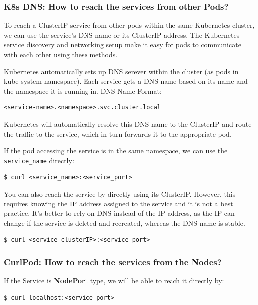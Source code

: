 \documentclass{article}
\newenvironment{blocktemplateII}[1]{%
    \tcolorbox[beamer,%
    noparskip,breakable,
    colframe=Green,%
    colbacklower=LimeGreen!75!LightGreen,%
    title=#1]}%
    {\endtcolorbox}
\newenvironment{codetemplate}[1][]{%
  \mybasecolorbox[#1]
  \itshape
}{%
  \endmybasecolorbox
}
\begin{document}
\subsubsection{K8s DNS: How to reach the services from other Pods?}
To reach a ClusterIP service from other pods within the same Kubernetes cluster, we can use the service's DNS name or its ClusterIP address. The Kubernetes service discovery and networking setup make it easy for pods to communicate with each other using these methods.

Kubernetes automatically sets up DNS serever within the cluster (as pods in kube-system namespace). Each service gets a DNS name based on its name and the namespace it is running in. DNS Name Format: 
\begin{codetemplate}{}
\begin{verbatim}
<service-name>.<namespace>.svc.cluster.local
\end{verbatim}
\end{codetemplate}

Kubernetes will automatically resolve this DNS name to the ClusterIP and route the traffic to the service, which in turn forwards it to the appropriate pod.

\begin{blocktemplateII}{NOTE}
If the pod accessing the service is in the same namespace, we can use the \verb|service_name| directly:
\begin{codetemplate}{}
\begin{verbatim}
$ curl <service_name>:<service_port>
\end{verbatim}
\end{codetemplate}
\end{blocktemplateII}

You can also reach the service by directly using its ClusterIP. However, this requires knowing the IP address assigned to the service and it is not a best practice. It's better to rely on DNS instead of the IP address, as the IP can change if the service is deleted and recreated, whereas the DNS name is stable.
\begin{codetemplate}{}
\begin{verbatim}
$ curl <service_clusterIP>:<service_port>
\end{verbatim}
\end{codetemplate}

\subsubsection{CurlPod: How to reach the services from the Nodes?}
If the Service is \textbf{NodePort} type, we will be able to reach it directly by:
\begin{codetemplate}{}
\begin{verbatim}
$ curl localhost:<service_port>
\end{verbatim}
\end{codetemplate}
\end{document}
